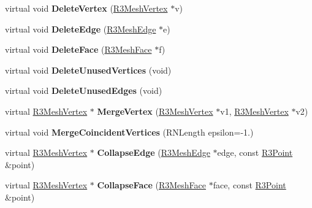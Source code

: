 \begin{DoxyCompactItemize}
\item 
virtual void {\bfseries Delete\+Vertex} (\hyperlink{class_r3_mesh_vertex}{R3\+Mesh\+Vertex} $\ast$v)\hypertarget{class_r3_mesh_a356ae5c398a642088fb9e947af24654b}{}\label{class_r3_mesh_a356ae5c398a642088fb9e947af24654b}

\item 
virtual void {\bfseries Delete\+Edge} (\hyperlink{class_r3_mesh_edge}{R3\+Mesh\+Edge} $\ast$e)\hypertarget{class_r3_mesh_a0d284ca626f131e27771275fc84d12fc}{}\label{class_r3_mesh_a0d284ca626f131e27771275fc84d12fc}

\item 
virtual void {\bfseries Delete\+Face} (\hyperlink{class_r3_mesh_face}{R3\+Mesh\+Face} $\ast$f)\hypertarget{class_r3_mesh_a3bfef65900fe9120fd717a74d661ed75}{}\label{class_r3_mesh_a3bfef65900fe9120fd717a74d661ed75}

\item 
virtual void {\bfseries Delete\+Unused\+Vertices} (void)\hypertarget{class_r3_mesh_a952b90f07c4a66a8e8f4e7b38bbf0d01}{}\label{class_r3_mesh_a952b90f07c4a66a8e8f4e7b38bbf0d01}

\item 
virtual void {\bfseries Delete\+Unused\+Edges} (void)\hypertarget{class_r3_mesh_a3fc1cfda96f3a2239a1313a241b5eed1}{}\label{class_r3_mesh_a3fc1cfda96f3a2239a1313a241b5eed1}

\item 
virtual \hyperlink{class_r3_mesh_vertex}{R3\+Mesh\+Vertex} $\ast$ {\bfseries Merge\+Vertex} (\hyperlink{class_r3_mesh_vertex}{R3\+Mesh\+Vertex} $\ast$v1, \hyperlink{class_r3_mesh_vertex}{R3\+Mesh\+Vertex} $\ast$v2)\hypertarget{class_r3_mesh_a1e1a3f20c1c541c3bf1c6b9f2f5df5d2}{}\label{class_r3_mesh_a1e1a3f20c1c541c3bf1c6b9f2f5df5d2}

\item 
virtual void {\bfseries Merge\+Coincident\+Vertices} (R\+N\+Length epsilon=-\/1.)\hypertarget{class_r3_mesh_a0fcf6fecc55ba2515b0fcc26d6a80b1b}{}\label{class_r3_mesh_a0fcf6fecc55ba2515b0fcc26d6a80b1b}

\item 
virtual \hyperlink{class_r3_mesh_vertex}{R3\+Mesh\+Vertex} $\ast$ {\bfseries Collapse\+Edge} (\hyperlink{class_r3_mesh_edge}{R3\+Mesh\+Edge} $\ast$edge, const \hyperlink{class_r3_point}{R3\+Point} \&point)\hypertarget{class_r3_mesh_a008fc56832832b23d86399744048a8d6}{}\label{class_r3_mesh_a008fc56832832b23d86399744048a8d6}

\item 
virtual \hyperlink{class_r3_mesh_vertex}{R3\+Mesh\+Vertex} $\ast$ {\bfseries Collapse\+Face} (\hyperlink{class_r3_mesh_face}{R3\+Mesh\+Face} $\ast$face, const \hyperlink{class_r3_point}{R3\+Point} \&point)\hypertarget{class_r3_mesh_a73f3f4bf4e53ce1638f5388fa738dec4}{}\label{class_r3_mesh_a73f3f4bf4e53ce1638f5388fa738dec4}


\end{DoxyCompactItemize}
